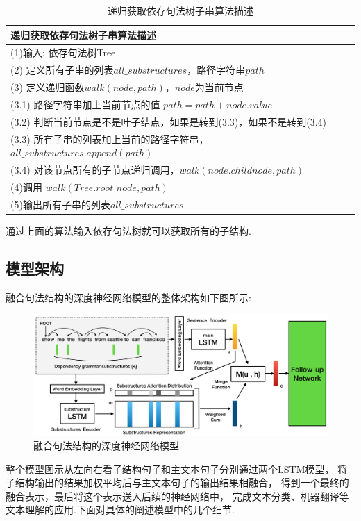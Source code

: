 \documentclass[bachelor,winfonts]{jnuthesis}
\begin{document}
\begin{table}[h!]
  \centering
  \begin{tabular}{l}
    \toprule
    \textbf{递归获取依存句法树子串算法描述} \\
    \midrule
    (1)输入: 依存句法树Tree \\
    (2) 定义所有子串的列表$all\_substructures$，路径字符串$path$ \\
    (3) 定义递归函数$walk(node,path)$，$node$为当前节点 \\
    (3.1) 路径字符串加上当前节点的值 $path = path + node.value$ \\
    (3.2) 判断当前节点是不是叶子结点，如果是转到(3.3)，如果不是转到(3.4)\\
    (3.3) 所有子串的列表加上当前的路径字符串，$all\_substructures.append(path)$ \\
    (3.4) 对该节点所有的子节点递归调用，$walk(node.childnode,path)$ \\
    (4)调用 $walk(Tree.root\_node,path)$ \\
    (5)输出所有子串的列表$all\_substructures$ \\
    \bottomrule
  \end{tabular}
  \caption{递归获取依存句法树子串算法描述}
\end{table}
通过上面的算法输入依存句法树就可以获取所有的子结构.

\subsection{模型架构}
融合句法结构的深度神经网络模型的整体架构如下图所示:
\begin{figure}[h!]
  \centering
  \includegraphics[width=0.95\linewidth]{model.png}
  \caption{融合句法结构的深度神经网络模型}
\end{figure}

整个模型图示从左向右看子结构句子和主文本句子分别通过两个LSTM模型，
将子结构输出的结果加权平均后与主文本句子的输出结果相融合，
得到一个最终的融合表示，最后将这个表示送入后续的神经网络中，
完成文本分类、机器翻译等文本理解的应用.下面对具体的阐述模型中的几个细节.
\end{document}
